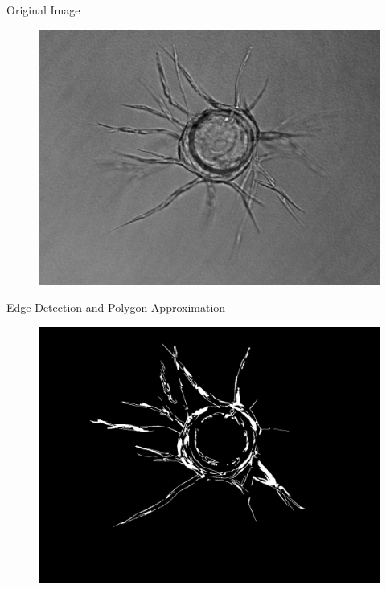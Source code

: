 \documentclass{beamer}
\begin{document}
\begin{frame}{Original Image}
	\begin{figure}
		\centering
		\includegraphics[width=\textwidth]{images/mono}
	\end{figure}
\end{frame}

\begin{frame}{Edge Detection and Polygon Approximation}
	\begin{figure}
		\centering
		\includegraphics[width=\textwidth]{images/mono_preprocessed}
	\end{figure}
\end{frame}
\end{document}
